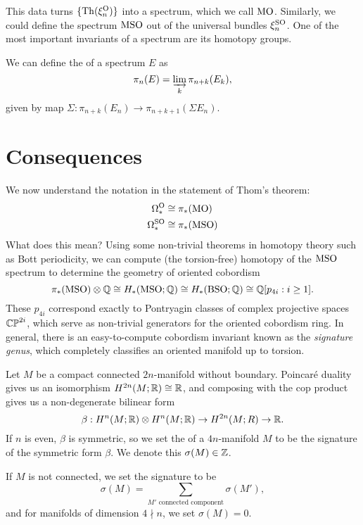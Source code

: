 \documentclass{article}
\begin{document}
This data turns $\{\mathrm{Th}(\xi_n^{\mathrm{O}})\}$ into a spectrum, which we call $\mathrm{MO}$. Similarly, we could define the spectrum $\mathrm{MSO}$ out of the universal bundles $\xi_n^{\mathrm{SO}}$. One of the most important invariants of a spectrum are its homotopy groups. 

\begin{definition}
  We can define the  of a spectrum $E$ as
\[
    \pi_n(E) = \varinjlim_k \pi_{n+k}(E_k),
\]
given by map $\Sigma : \pi_{n+k}(E_n) \to \pi_{n+k+1}(\Sigma E_n)$.
\end{definition}

\section{Consequences}

We now understand the notation in the statement of Thom's theorem:
\[
  \begin{aligned}
    \Omega^{\mathrm{O}}_* &\cong \pi_*(\mathrm{MO})\\
    \Omega^{\mathrm{SO}}_* &\cong \pi_*(\mathrm{MSO})
  \end{aligned}
\]
What does this mean? Using some non-trivial theorems in homotopy theory such as Bott periodicity, we can compute (the torsion-free) homotopy of the $\mathrm{MSO}$ spectrum to determine the geometry of oriented cobordism 
\[
  \pi_*(\mathrm{MSO})\otimes \mathbb{Q} \cong H_*(\mathrm{MSO}; \mathbb{Q}) \cong H_*(\mathrm{BSO}; \mathbb{Q}) \cong \mathbb{Q}[p_{4i} : i \geq 1].
\]
These $p_{4i}$ correspond exactly to Pontryagin classes of complex projective spaces $\mathbb{CP}^{2i}$, which serve as non-trivial generators for the oriented cobordism ring. In general, there is an easy-to-compute cobordism invariant known as the \emph{signature genus}, which completely classifies an oriented manifold up to torsion.

\begin{definition}
  Let $M$ be a compact connected $2n$-manifold without boundary. Poincar\'e duality gives us an isomorphism $H^{2n}(M; \mathbb{R}) \cong \mathbb{R}$, and composing with the cop product gives us a non-degenerate bilinear form
  \[
    \beta : H^n(M;\mathbb{R})\otimes H^n(M; \mathbb{R}) \to H^{2n}(M; R) \to \mathbb{R}.
  \]
  If $n$ is even, $\beta$ is symmetric, so we set the  of a $4n$-manifold $M$ to be the signature of the symmetric form $\beta$. We denote this $\sigma(M)\in \mathbb{Z}$. 
\end{definition}

If $M$ is not connected, we set the signature to be
\[
    \sigma(M) = \sum_{M'\textrm{ connected component}} \sigma(M'),
\]
and for manifolds of dimension $4\nmid n$, we set $\sigma(M)=0$. 
\end{document}
